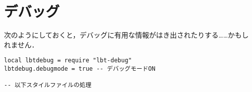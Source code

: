 \documentclass[a4paper]{ltjsarticle}
\newcommand{\luafunc}[1]{\texttt{#1}}
\newcommand*{\luavar}[1]{\texttt{#1}}
\begin{document}
\section{デバッグ}
次のようにしておくと，デバッグに有用な情報がはき出されたりする……かもしれません．
\begin{lstlisting}
local lbtdebug = require "lbt-debug"
lbtdebug.debugmode = true -- デバッグモードON

-- 以下スタイルファイルの処理
\end{lstlisting}

%
%
\end{document}
